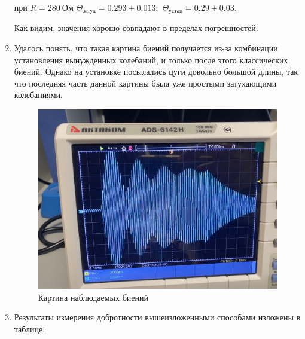 \documentclass[a4paper,12pt]{extarticle}
\begin{document}
\begin{enumerate}
    при $R = 280 \ \text{Ом}$ $\Theta_\text{затух} = 0.293 \pm 0.013;$ $\Theta_\text{устан} = 0.29 \pm 0.03$.

    Как видим, значения хорошо совпадают в пределах погрешностей.

    \item Удалось понять, что такая картина биений получается из-за комбинации установления вынужденных колебаний, и только после этого классических биений. Однако на установке посылались цуги довольно большой длины, так что последняя часть данной картины была уже простыми затухающими колебаниями.
    \begin{figure}[h!]
    \centering
    \includegraphics[width=0.8\linewidth]{bien.jpg}
    \caption{Картина наблюдаемых биений}
    \end{figure}

    \item Результаты измерения добротности вышеизложенными способами изложены в таблице:



\end{enumerate}
\end{document}
